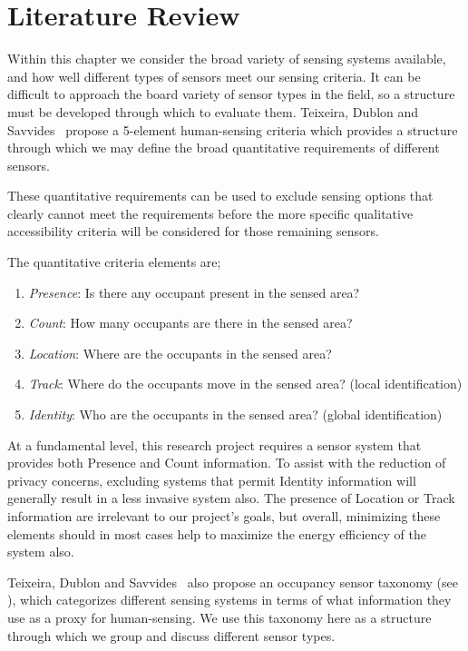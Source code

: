 \documentclass[../thesis/thesis.tex]{subfiles}
\begin{document}
\chapter{Literature Review}
\label{chap:litreview}

Within this chapter we consider the broad variety of sensing systems available, and how well different types of sensors meet our sensing criteria. It can be difficult to approach the board variety of sensor types in the field, so a structure must be developed through which to evaluate them. Teixeira, Dublon and Savvides~\cite{teixeira2010survey} propose a 5-element human-sensing criteria which provides a structure through which we may define the broad quantitative requirements of different sensors.

These quantitative requirements can be used to exclude sensing options that clearly cannot meet the requirements before the more specific qualitative accessibility criteria will be considered for those remaining sensors. 

The quantitative criteria elements are;
\begin{enumerate}
 \item \emph{Presence}: Is there any occupant present in the sensed area?
 \item \emph{Count}: How many occupants are there in the sensed area?
 \item \emph{Location}: Where are the occupants in the sensed area?
 \item \emph{Track}: Where do the occupants move in the sensed area? (local identification)
 \item \emph{Identity}: Who are the occupants in the sensed area? (global identification)
\end{enumerate}

At a fundamental level, this research project requires a sensor system that provides both Presence and Count information. To assist with the reduction of privacy concerns, excluding systems that permit Identity information will generally result in a less invasive system also. The presence of Location or Track information are irrelevant to our project's goals, but overall, minimizing these elements should in most cases help to maximize the energy efficiency of the system also.

Teixeira, Dublon and Savvides~\cite{teixeira2010survey} also propose an occupancy sensor taxonomy (see ), which categorizes different sensing systems in terms of what information they use as a proxy for human-sensing. We use this taxonomy here as a structure through which we group and discuss different sensor types.
\end{document}
